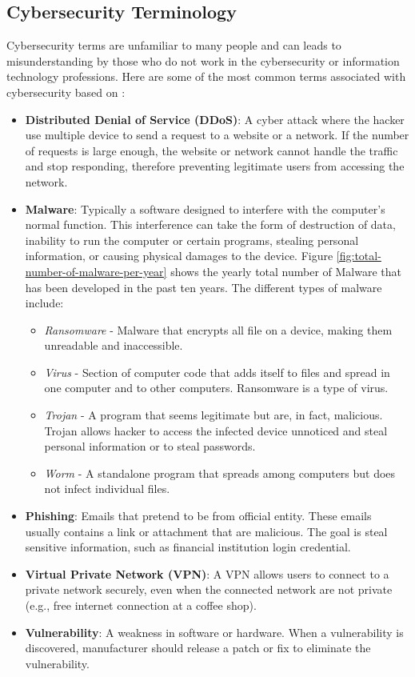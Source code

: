 \documentclass[pdf,bookmarks,colorlinks=true]{IEEEtran}
\begin{document}
\subsection{Cybersecurity Terminology}
Cybersecurity terms are unfamiliar to many people and can leads to misunderstanding by those who do not work in the cybersecurity or information technology professions. Here are some of the most common terms associated with cybersecurity based on \cite{ferrara2019cybersecurity}:
\begin{itemize}
	\item {\bf Distributed Denial of Service (DDoS)}: A cyber attack where the hacker use multiple device to send a request to a website or a network. If the number of requests is large enough, the website or network cannot handle the traffic and stop responding, therefore preventing legitimate users from accessing the network.
	\item {\bf Malware}: Typically a software designed to interfere with the computer's normal function. This interference can take the form of destruction of data, inability to run the computer or certain programs, stealing personal information, or causing physical damages to the device. Figure \ref{fig:total-number-of-malware-per-year} shows the yearly total number of Malware that has been developed in the past ten years. The different types of malware include:
	\begin{itemize}
		\item {\em Ransomware} - Malware that encrypts all file on a device, making them unreadable and inaccessible.
		\item {\em Virus} - Section of computer code that adds itself to files and spread in one computer and to other computers. Ransomware is a type of virus.
		\item {\em Trojan} - A program that seems legitimate but are, in fact, malicious. Trojan allows hacker to access the infected device unnoticed and steal personal information or to steal passwords.
		\item {\em Worm} - A standalone program that spreads among computers but does not infect individual files.
	\end{itemize}
	\item {\bf Phishing}: Emails that pretend to be from official entity. These emails usually contains a link or attachment that are malicious. The goal is steal sensitive information, such as financial institution login credential.
	\item {\bf Virtual Private Network (VPN)}: A VPN allows users to connect to a private network securely, even when the connected network are not private (e.g., free internet connection at a coffee shop).
	\item {\bf Vulnerability}: A weakness in software or hardware. When a vulnerability is discovered, manufacturer should release a patch or fix to eliminate the vulnerability.
\end{itemize}
\end{document}
